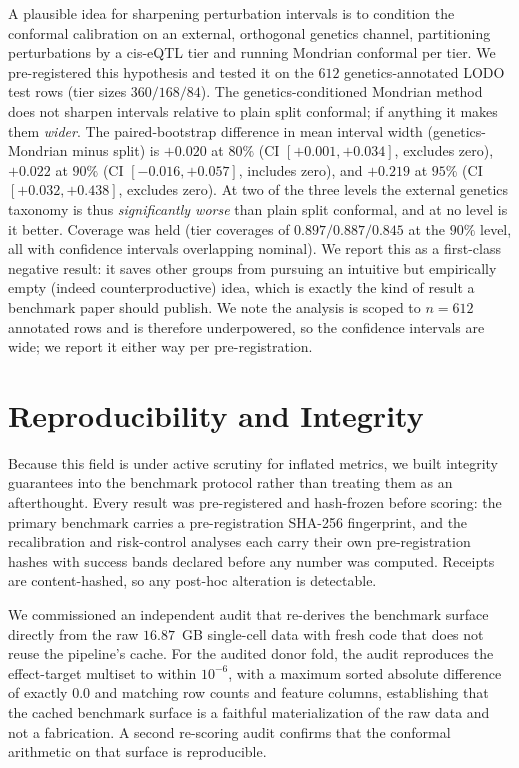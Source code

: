 \documentclass{article}
\begin{document}
A plausible idea for sharpening perturbation intervals is to condition
the conformal calibration on an external, orthogonal genetics channel,
partitioning perturbations by a cis-eQTL tier and running Mondrian
conformal per tier. We pre-registered this hypothesis and tested it on
the $612$ genetics-annotated LODO test rows (tier sizes $360/168/84$).
The genetics-conditioned Mondrian method does not sharpen intervals
relative to plain split conformal; if anything it makes them
\emph{wider}. The paired-bootstrap difference in mean interval width
(genetics-Mondrian minus split) is $+0.020$ at $80\%$ (CI
$[+0.001,+0.034]$, excludes zero), $+0.022$ at $90\%$ (CI
$[-0.016,+0.057]$, includes zero), and $+0.219$ at $95\%$ (CI
$[+0.032,+0.438]$, excludes zero). At two of the three levels the
external genetics taxonomy is thus \emph{significantly worse} than plain
split conformal, and at no level is it better. Coverage was held (tier
coverages of $0.897/0.887/0.845$ at the $90\%$ level, all with confidence
intervals overlapping nominal). We report this as a first-class negative
result: it saves other groups from pursuing an intuitive but empirically
empty (indeed counterproductive) idea, which is exactly the kind of
result a benchmark paper should publish. We note the analysis is scoped
to $n{=}612$ annotated rows and is therefore underpowered, so the
confidence intervals are wide; we report it either way per
pre-registration.

\section{Reproducibility and Integrity}

Because this field is under active scrutiny for inflated metrics, we
built integrity guarantees into the benchmark protocol rather than
treating them as an afterthought. Every result was pre-registered and
hash-frozen before scoring: the primary benchmark carries a
pre-registration SHA-256 fingerprint, and the recalibration and
risk-control analyses each carry their own pre-registration hashes with
success bands declared before any number was computed. Receipts are
content-hashed, so any post-hoc alteration is detectable.

We commissioned an independent audit that re-derives the benchmark
surface directly from the raw $16.87$~GB single-cell data with fresh code
that does not reuse the pipeline's cache. For the audited donor fold, the
audit reproduces the effect-target multiset to within $10^{-6}$, with a
maximum sorted absolute difference of exactly $0.0$ and matching row
counts and feature columns, establishing that the cached benchmark
surface is a faithful materialization of the raw data and not a
fabrication. A second re-scoring audit confirms that the conformal
arithmetic on that surface is reproducible.
\end{document}
